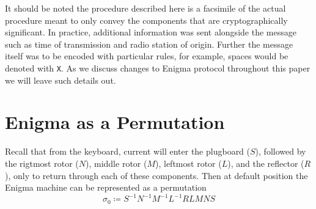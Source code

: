 \noindent It should be noted the procedure described here is a
facsimile of the actual procedure meant to only convey the components
that are cryptographically significant. In practice, additional
information was sent alongside the message such as time of
transmission and radio station of origin. Further the message itself
was to be encoded with particular rules, for example, spaces would be
denoted with \texttt{X}. As we discuss changes to Enigma protocol
throughout this paper we will leave such details out.


\section{Enigma as a Permutation}

Recall that from the keyboard, current will enter the plugboard
($S$), followed by the rigtmost rotor ($N$), middle
rotor ($M$), leftmost rotor ($L$), and the reflector ($R$), only to
return through each of these components. Then at default position the
Enigma machine can be represented as a permutation
\[
	\sigma_0 \coloneq S^{-1}N^{-1}M^{-1}L^{-1}RLMNS
\]

